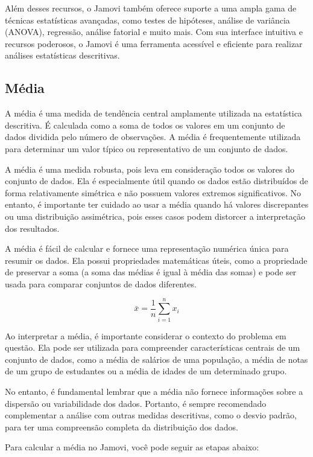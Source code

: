 Além desses recursos, o Jamovi também oferece suporte a uma ampla gama de técnicas estatísticas avançadas, como testes de hipóteses, análise de variância (ANOVA), regressão, análise fatorial e muito mais. Com sua interface intuitiva e recursos poderosos, o Jamovi é uma ferramenta acessível e eficiente para realizar análises estatísticas descritivas.

\subsection{Média}

A média é uma medida de tendência central amplamente utilizada na estatística descritiva. É calculada como a soma de todos os valores em um conjunto de dados dividida pelo número de observações. A média é frequentemente utilizada para determinar um valor típico ou representativo de um conjunto de dados.

A média é uma medida robusta, pois leva em consideração todos os valores do conjunto de dados. Ela é especialmente útil quando os dados estão distribuídos de forma relativamente simétrica e não possuem valores extremos significativos. No entanto, é importante ter cuidado ao usar a média quando há valores discrepantes ou uma distribuição assimétrica, pois esses casos podem distorcer a interpretação dos resultados.

A média é fácil de calcular e fornece uma representação numérica única para resumir os dados. Ela possui propriedades matemáticas úteis, como a propriedade de preservar a soma (a soma das médias é igual à média das somas) e pode ser usada para comparar conjuntos de dados diferentes.

\[
\bar{x} = \frac{1}{n} \sum_{i=1}^{n} x_i
\]

Ao interpretar a média, é importante considerar o contexto do problema em questão. Ela pode ser utilizada para compreender características centrais de um conjunto de dados, como a média de salários de uma população, a média de notas de um grupo de estudantes ou a média de idades de um determinado grupo.

No entanto, é fundamental lembrar que a média não fornece informações sobre a dispersão ou variabilidade dos dados. Portanto, é sempre recomendado complementar a análise com outras medidas descritivas, como o desvio padrão, para ter uma compreensão completa da distribuição dos dados.

Para calcular a média no Jamovi, você pode seguir as etapas abaixo:

